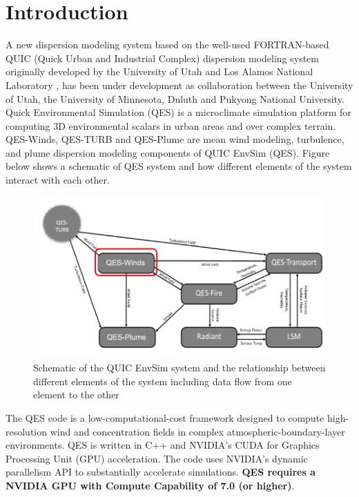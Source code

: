 \section{Introduction}

A new dispersion modeling system based on the well-used FORTRAN-based QUIC (Quick Urban and Industrial Complex) dispersion modeling system originally developed by the University of Utah and Los Alamos National Laboratory \cite{brown2013quic}, has been under development as collaboration between the University of Utah, the University of Minnesota, Duluth and Pukyong National University. Quick Environmental Simulation (QES) is a microclimate simulation platform for computing 3D environmental scalars in urban areas and over complex terrain. QES-Winds, QES-TURB and QES-Plume are mean wind modeling, turbulence, and plume dispersion modeling components of QUIC EnvSim (QES). Figure below shows a schematic of QES system and how different elements of the system interact with each other.

\begin{figure}[h!]
\includegraphics[width=16cm]{Images/QES_chart.png}
\centering
\caption{Schematic of the QUIC EnvSim system and the relationship between different elements of the system including data flow from one element to the other}
\end{figure}

The QES code is a low-computational-cost framework designed to compute high-resolution wind and concentration fields in complex atmospheric-boundary-layer environments. QES is written in C++ and NVIDIA's CUDA for Graphics Processing Unit (GPU) acceleration. The code uses NVIDIA's dynamic parallelism API to substantially accelerate simulations. \textbf{QES requires a NVIDIA GPU with Compute Capability of 7.0 (or higher)}.


